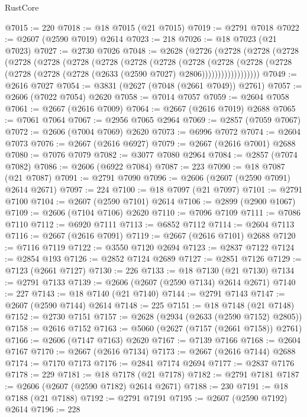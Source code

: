 \begin{lexlean}{RustCore}
\begin{coremodule}
@7015 := 220
@7018 := @18 @7015 (@21 @7015)
@7019 := @2791 @7018
@7022 := @2607 (@2590 @7019) @2614
@7023 := 218
@7026 := @18 @7023 (@21 @7023)
@7027 := @2730 @7026
@7048 := @2628
    (@2726
      (@2728
        (@2728
          (@2728
            (@2728
              (@2728
                (@2728
                  (@2728
                    (@2728
                      (@2728
                        (@2728
                          (@2728
                            (@2728
                              (@2728
                                (@2728 (@2728 (@2728 (@2633 (@2590 @7027) @2806))))))))))))))))))
@7049 := @2616 @7027
@7054 := @3831 (@2627 (@7048 (@2661 @7049)) @2761)
@7057 := @2606 (@7022 @7054) @2620
@7058 := @7014 @7057
@7059 := @2604 @7058
@7061 := @2667 (@2616 @7009)
@7064 := @2667 (@2616 @7019) @2688
@7065 := @7061 @7064
@7067 := @2956 @7065 @2964
@7069 := @2857 (@7059 @7067)
@7072 := @2606 (@7004 @7069) @2620
@7073 := @6996 @7072
@7074 := @2604 @7073
@7076 := @2667 (@2616 @6927)
@7079 := @2667 (@2616 @7001) @2688
@7080 := @7076 @7079
@7082 := @3077 @7080 @2964
@7084 := @2857 (@7074 @7082)
@7086 := @2606 (@6922 @7084)
@7087 := 223
@7090 := @18 @7087 (@21 @7087)
@7091 := @2791 @7090
@7096 := @2606 (@2607 (@2590 @7091) @2614 @2671)
@7097 := 224
@7100 := @18 @7097 (@21 @7097)
@7101 := @2791 @7100
@7104 := @2607 (@2590 @7101) @2614
@7106 := @2899 (@2900 @1067)
@7109 := @2606 (@7104 @7106) @2620
@7110 := @7096 @7109
@7111 := @7086 @7110
@7112 := @6920 @7111
@7113 := @6852 @7112
@7114 := @2604 @7113
@7116 := @2667 (@2616 @7091)
@7119 := @2667 (@2616 @7101) @2688
@7120 := @7116 @7119
@7122 := @3550 @7120 @2694
@7123 := @2837 @7122
@7124 := @2854 @193
@7126 := @2852 @7124 @2689
@7127 := @2851 @7126
@7129 := @7123 (@2661 @7127)
@7130 := 226
@7133 := @18 @7130 (@21 @7130)
@7134 := @2791 @7133
@7139 := @2606 (@2607 (@2590 @7134) @2614 @2671)
@7140 := 227
@7143 := @18 @7140 (@21 @7140)
@7144 := @2791 @7143
@7147 := @2607 (@2590 @7144) @2614
@7148 := 225
@7151 := @18 @7148 (@21 @7148)
@7152 := @2730 @7151
@7157 := @2628 (@2934 (@2633 (@2590 @7152) @2805))
@7158 := @2616 @7152
@7163 := @5060 (@2627 (@7157 (@2661 @7158)) @2761)
@7166 := @2606 (@7147 @7163) @2620
@7167 := @7139 @7166
@7168 := @2604 @7167
@7170 := @2667 (@2616 @7134)
@7173 := @2667 (@2616 @7144) @2688
@7174 := @7170 @7173
@7176 := @2841 @7174 @2694
@7177 := @2837 @7176
@7178 := 229
@7181 := @18 @7178 (@21 @7178)
@7182 := @2791 @7181
@7187 := @2606 (@2607 (@2590 @7182) @2614 @2671)
@7188 := 230
@7191 := @18 @7188 (@21 @7188)
@7192 := @2791 @7191
@7195 := @2607 (@2590 @7192) @2614
@7196 := 228

\end{coremodule}
\end{lexlean}
